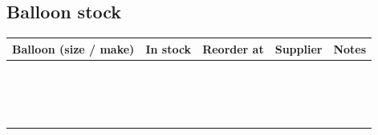 \documentclass[11pt,openany]{report}
\begin{document}
\subsection*{Balloon stock}
{\renewcommand{\arraystretch}{2.6}\small
\begin{tabularx}{\textwidth}{|>{\raggedright\arraybackslash}p{3.6cm}|>{\raggedright\arraybackslash}p{2.1cm}|>{\raggedright\arraybackslash}p{2.1cm}|>{\raggedright\arraybackslash}p{3.1cm}|X|}
\hline
\rowcolor{tlorange!22}
\textbf{Balloon (size / make)} & \textbf{In stock} & \textbf{Reorder at} & \textbf{Supplier} & \textbf{Notes} \\ \hline
 & & & & \\ \hline
 & & & & \\ \hline
 & & & & \\ \hline
 & & & & \\ \hline
 & & & & \\ \hline
 & & & & \\ \hline
 & & & & \\ \hline
 & & & & \\ \hline
 & & & & \\ \hline
 & & & & \\ \hline
 & & & & \\ \hline
 & & & & \\ \hline
 & & & & \\ \hline
 & & & & \\ \hline
 & & & & \\ \hline
 & & & & \\ \hline
\end{tabularx}}

\clearpage
\end{document}
